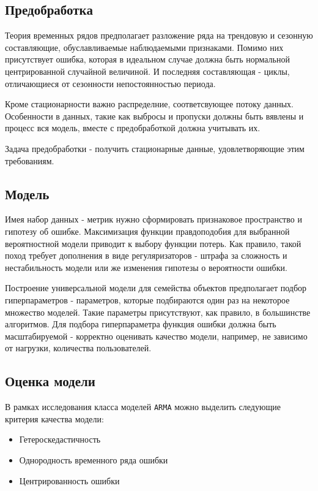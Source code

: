 \documentclass[14pt, a4paper]{extarticle}
\begin{document}
	\subsection{Предобработка}
	Теория временных рядов предполагает разложение ряда на трендовую и сезонную составляющие, обуславливаемые наблюдаемыми признаками. 
	Помимо них присутствует ошибка, которая в идеальном случае должна быть нормальной центрированной случайной величиной.
	И последняя составляющая - циклы, отличающиеся от сезонности непостоянностью периода.
	
	Кроме стационарности важно распределние, соответсвующее потоку данных.
	Особенности в данных, такие как выбросы и пропуски должны быть вявлены и процесс вся модель, вместе с предобработкой должна учитывать их.

	Задача предобработки - получить стационарные данные, удовлетворяющие этим требованиям.


	\subsection{Модель}

	Имея набор данных - метрик нужно сформировать признаковое пространство и гипотезу об ошибке.
	Максимизация функции правдоподобия для выбранной вероятностной модели приводит к выбору функции потерь.
	Как правило, такой поход требует дополнения в виде регуляризаторов - штрафа за сложность и нестабильность модели или же изменения гипотезы о вероятности ошибки.
	
	Построение универсальной модели для семейства объектов предполагает подбор гиперпараметров - параметров, которые подбираются один раз на некоторое множество моделей.
	Такие параметры присутствуют, как правило, в большинстве алгоритмов.	
	Для подбора гиперпараметра функция ошибки должна быть масштабируемой - корректно оценивать качество модели, например, не зависимо от нагрузки, количества пользователей.


	\subsection{Оценка модели}
	В рамках исследования класса моделей \texttt{ARMA} можно выделить следующие критерия качества модели:
	\begin{itemize}
	\item Гетероскедастичность
	\item Однородность временного ряда ошибки
	\item Центрированность ошибки
	\end{itemize}
	
\end{document}
